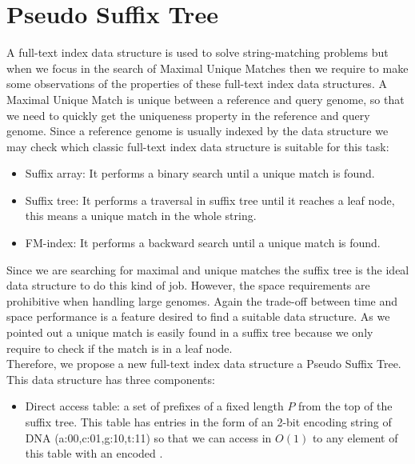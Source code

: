 \documentclass[runningheads,a4paper]{llncs}
\begin{document}
\section{Pseudo Suffix Tree}
A full-text index data structure is used to solve string-matching problems but when we focus in the search of Maximal Unique Matches then we require to make some observations of the properties of these full-text index data structures. A Maximal Unique Match is unique between a reference and query genome, so that we need to quickly get the uniqueness property in the reference and query genome. Since a reference genome is usually indexed by the data structure we may check which classic full-text index data structure is suitable for this task:
\begin{itemize}
  \item Suffix array: It performs a binary search until a unique match is found.
  \item Suffix tree: It performs a traversal in suffix tree until it reaches a leaf node, this means a unique match in the whole string.
  \item FM-index: It performs a backward search until a unique match is found.
\end{itemize}
Since we are searching for maximal and unique matches the suffix tree is the ideal data structure to do this kind of job. However, the space requirements are prohibitive when handling large genomes. Again the trade-off between time and space performance is a feature desired to find a suitable data structure. As we pointed out a unique match is easily found in a suffix tree because we only require to check if the match is in a leaf node.\\
Therefore, we propose a new full-text index data structure a Pseudo Suffix Tree. This data structure has three components:
\begin{itemize}
  \item Direct access table: a set of prefixes of a fixed length $P$ from the top of the suffix tree. This table has entries in the form of an 2-bit encoding string of DNA (a:00,c:01,g:10,t:11) so that we can access in $O(1)$ to any element of this table with an encoded . 
\end{itemize}
\end{document}
